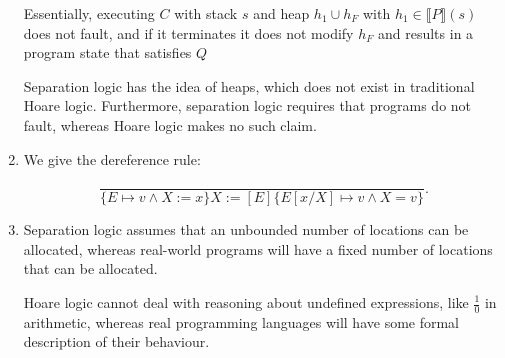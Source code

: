 \begin{enumerate}[label=(\alph*)]
        Essentially, executing $C$ with stack $s$ and heap $h_1 \cup h_F$ with $h_1 \in \llbracket P \rrbracket(s)$ does not fault, and if it terminates it does not modify $h_F$ and results in a program state that satisfies $Q$

        Separation logic has the idea of heaps, which does not exist in traditional Hoare logic. Furthermore, separation logic requires that programs do not fault, whereas Hoare logic makes no such claim.

        \item
          We give the dereference rule:

          \[
            \frac{}{\{E \mapsto v \wedge X := x \}X := [E]\{E[x /X] \mapsto v \wedge X =v\}}
          .\] 

          \item

            Separation logic assumes that an unbounded number of locations can be allocated, whereas real-world programs will have a fixed number of locations that can be allocated.

            Hoare logic cannot deal with reasoning about undefined expressions, like $\frac{1}{0}$ in arithmetic, whereas real programming languages will have some formal description of their behaviour.








        
    \end{enumerate}

